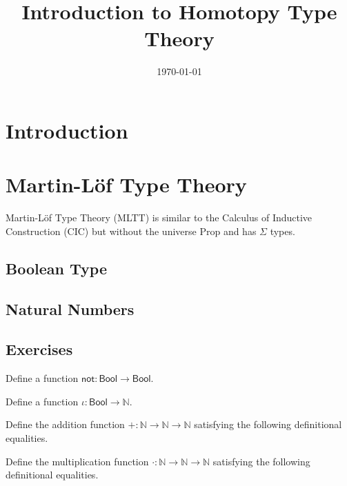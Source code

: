 \documentclass{amsart}
\title{Introduction to Homotopy Type Theory}
\author{}
\date{\today}
\begin{document}
\maketitle
\tableofcontents

\newcommand{\Bool}[0]{\ensuremath{\mathsf{Bool}}}
\newcommand{\Nat}[0]{\ensuremath{\mathbb{N}}}

\section{Introduction}
\label{sec:introduction}

\section{Martin-L\"{o}f Type Theory}
\label{sec:martin-lof-type-theory}
Martin-L\"{o}f Type Theory (MLTT) is similar to the Calculus of Inductive Construction (CIC) but without the universe Prop and has $\Sigma$ types.

\subsection{Boolean Type}
\label{sec:boolean-type}

\subsection{Natural Numbers}
\label{sec:natural-numbers}


\subsection{Exercises}
\label{sec:exercises}

\begin{ex}
  Define a function $\mathsf{not} : \Bool \to \Bool$.
\end{ex}

\begin{ex}
  Define a function $\iota : \Bool \to \Nat$.
\end{ex}

\begin{ex}
  Define the addition function $+ : \Nat \to \Nat \to \Nat$ satisfying the following definitional equalities.
\end{ex}

\begin{ex}
  Define the multiplication function $\cdot : \Nat \to \Nat \to \Nat$ satisfying the following definitional equalities.
\end{ex}



\end{document}
